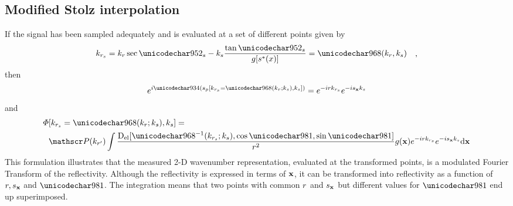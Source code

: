 \subsection{Modified Stolz interpolation}
\label{sc:modifiedStolz}
If the signal has been sampled adequately and is evaluated at a set of different points given by
\begin{equation}
\begin{split}
 \krstolt &= \kr\sec\thetas - \kparm\frac{\tan\thetas}{\gfunc[\myparm(\xang)]} = \stolt(\kr,\kparm)
\end{split},
\end{equation}
then
\begin{equation}
 \eex{\im\Phi(\stationaryparm[\krstolt = \stolt(\kr;\kparm),\kparm])} = \eex{-\im\range\krstolt}\eex{ -\im\targetxparm\kparm}
\end{equation}
and
\begin{equation}
\begin{split}
 \vkern&[\krstolt = \stolt(\kr;\kparm),\kparm] = \\&\Snvelope(\krc)\int\frac{\dconstelPattern[\stolt^{-1}(\krstolt;\kparm), \cos\targetdepression, \sin\targetdepression]}{\amplitude\range^2}\reflectivity(\targetnoparm)\eex{-\im\range\krstolt}\eex{ -\im\targetxparm\kparm}\d\targetnoparm
 \end{split}
\end{equation}
This formulation illustrates that the measured 2-D wavenumber representation, evaluated at the transformed points, is a modulated Fourier Transform of the reflectivity. Although the reflectivity is expressed in terms of $\mathbf{\mathbf{x}}$, it can be transformed into reflectivity as a function of $r, s_{\mathbf{x}}$ and $\targetdepression$. The integration means that two points with common $r$ and $s_{\mathbf{x}}$ but different values for $\targetdepression$ end up superimposed.
\par
